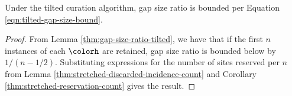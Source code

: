 \begin{theorem}
\label{thm:tilted-gap-size}
Under the tilted curation algorithm, gap size ratio is bounded per Equation \ref{eqn:tilted-gap-size-bound}.
\end{theorem}
\begin{proof}

From Lemma \ref{thm:gap-size-ratio-tilted}, we have that if the first $n$ instances of each \hv{} $\colorh$ are retained, gap size ratio is bounded below by $1/(n - 1/2)$.
Substituting expressions for the number of sites reserved per \hv{} $n$ from Lemma \ref{thm:stretched-discarded-incidence-count} and Corollary \ref{thm:stretched-reservation-count} gives the result.
\end{proof}
